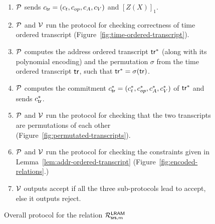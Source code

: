 \begin{figure}[htbp]
\begin{mdframed}
{\begin{enumerate}[leftmargin=1em, label=\arabic*.]
            \item $\mathcal{P}$ sends  $c_{\mathsf{tr}}=(c_t, c_{op}, c_A, c_V)$ and $[Z(X)]_1$.
            \item $\mathcal{P}$ and $\mathcal{V}$ run the protocol for checking correctness of time ordered transcript (Figure~\ref{fig:time-ordered-transcript}).
            \item $\mathcal{P}$ computes the address ordered transcript $\mathsf{tr}^{*}$ (along with its polynomial encoding) and the permutation $\sigma$ from the time ordered transcript $\mathsf{tr}$, such that $\mathsf{tr}^{*}= \sigma(\mathsf{tr})$.
%            
            \item $\mathcal{P}$ computes the commitment $c_{\mathsf{tr}}^\ast=(c_t^\ast,c_{op}^\ast, c_A^\ast, c_V^\ast)$ of $\mathsf{tr}^{*}$ and sends $c_{\mathsf{tr}}^\ast$.
            \item $\mathcal{P}$ and $\mathcal{V}$ run the protocol for checking that the two transcripts are permutations of each other \\(Figure~\ref{fig:permutated-transcripts}).
            \item $\mathcal{P}$ and $\mathcal{V}$ run  the protocol for checking the constraints given in Lemma~\ref{lem:addr-ordered-transcript} (Figure~\ref{fig:encoded-relations}.)
            \item $\mathcal{V}$ outputs accept if all the three sub-protocols lead to accept, else it outputs reject.
        \end{enumerate}
    }
    \end{mdframed}
    \caption{Overall protocol for the relation $\mathcal{R}^{\mathsf{LRAM}}_{\mathsf{srs},m}$}
    \label{fig:covering-protocol}
\end{figure}

\smallskip

